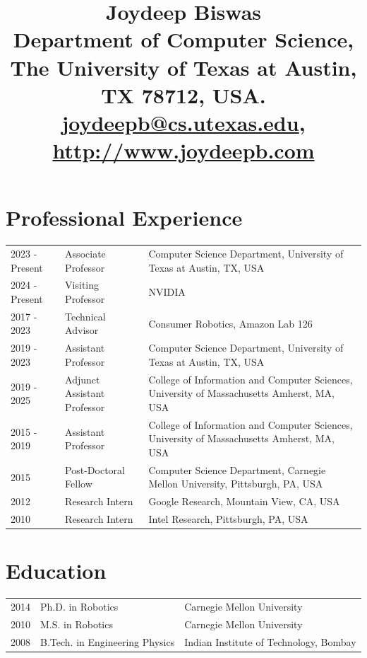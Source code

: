 \documentclass[Times]{article}
\begin{document}
\title{
\vspace{-3em}
\textbf{Joydeep Biswas}\\
\vspace{0.5em}
\normalsize{
Department of Computer Science, The University of Texas at Austin, TX 78712, USA.\\
\href{mailto:joydeepb@cs.utexas.edu}{joydeepb@cs.utexas.edu}, \href{http://www.joydeepb.com}{http://www.joydeepb.com}\vspace{-3em}}
}
\date{}
\maketitle

\section*{Professional Experience}
\begin{tabular}{ p{2cm} l p{8cm}}
  2023 - Present & Associate Professor & Computer Science Department,
  University of Texas at Austin, TX, USA \\
  2024 - Present & Visiting Professor & NVIDIA \\
  2017 - 2023 & Technical Advisor &  Consumer Robotics, Amazon Lab 126\\
  2019 - 2023 & Assistant Professor & Computer Science Department,
  University of Texas at Austin, TX, USA \\
  2019 - 2025 & Adjunct Assistant Professor &  College of Information and Computer Sciences, University of Massachusetts Amherst, MA, USA\\
  2015 - 2019  & Assistant Professor &  College of Information and Computer Sciences, University of Massachusetts Amherst, MA, USA\\
  2015 & Post-Doctoral Fellow &  Computer Science Department, Carnegie Mellon University, Pittsburgh, PA, USA\\
  2012 & Research Intern &  Google Research, Mountain View, CA, USA\\
  2010 & Research Intern &  Intel Research, Pittsburgh, PA, USA\\
\end{tabular}

\section*{Education}
\begin{tabular}{ p{1.2cm} l l }
  2014  & Ph.D. in Robotics  & Carnegie Mellon University \\
  2010  & M.S. in Robotics  & Carnegie Mellon University \\
  2008  & B.Tech. in Engineering Physics & Indian Institute of Technology, Bombay \\
\end{tabular}
\end{document}
